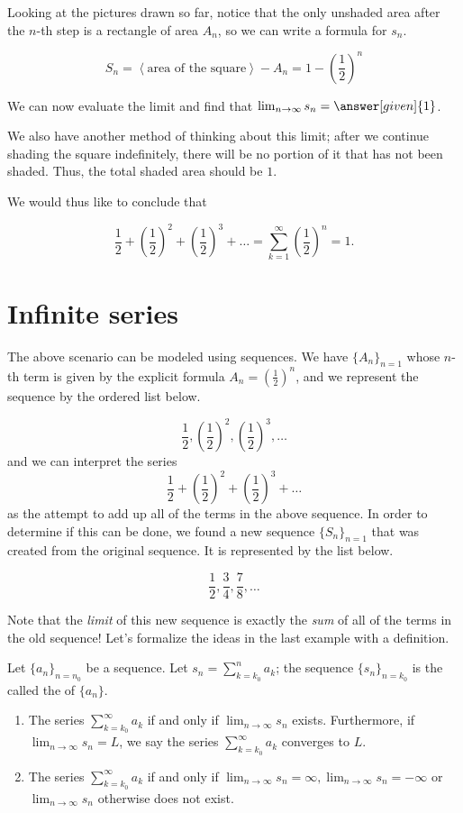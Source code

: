 \documentclass{ximera}
\begin{document}
\begin{example}
Looking at the pictures drawn so far, notice that the only unshaded area after the $n$-th step is a rectangle of area $A_n$, so we can write a formula for $s_n$.   

\[
S_n = \left<\textrm{area of the square}\right>-A_n = 1-\left(\frac{1}{2}\right)^n
\]

We can now evaluate the limit and find that $\lim_{n \to \infty} s_n =\answer[given]{1}$.

We also have another method of thinking about this limit; after we continue shading the square indefinitely, there will be no portion of it that has not been shaded.  Thus, the total shaded area should be $1$.

We would thus like to conclude that

\[
\frac{1}{2} + \left(\frac{1}{2}\right)^2+ \left(\frac{1}{2}\right)^3+ \ldots = \sum_{k=1}^{\infty} \left(\frac{1}{2}\right)^n =1.
\]
\end{example}

\section{Infinite series}
The above scenario can be modeled using sequences.  We have $\{A_n\}_{n=1}$ whose $n$-th term is given by the explicit formula $A_n=\left(\frac{1}{2}\right)^n$, and we represent the sequence by the ordered list below.

\[
\frac{1}{2},\left(\frac{1}{2}\right)^2,\left(\frac{1}{2}\right)^3,\ldots
\]
and we can interpret the series $$\frac{1}{2} + \left(\frac{1}{2}\right)^2+ \left(\frac{1}{2}\right)^3+ \ldots$$ as the attempt to add up all of the terms in the above sequence.  In order to determine if this can be done, we found a new sequence $\{S_n\}_{n=1}$ that was created from the original sequence.  It is represented by the list below.

\[
\frac{1}{2},\frac{3}{4},\frac{7}{8},\ldots
\]

Note that the \emph{limit} of this new sequence is exactly the \emph{sum} of all of the terms in the old sequence!  Let's formalize the ideas in the last example with a definition.

\begin{definition}
Let $\{a_n\}_{n=n_0}$ be a sequence.  Let $s_n = \sum_{k=k_0}^n a_k$; the sequence $\{s_n\}_{n=k_0}$ is the called the
   of $\{a_n\}$.  

\begin{enumerate}
\item The series $\sum_{k=k_0}^\infty a_k$  if and only if $\lim_{n\to\infty} s_n$ exists.  Furthermore, if $\lim_{n\to\infty} s_n =L$, we say the series $\sum_{k=k_0}^\infty a_k$ converges to $L$. 
\item The series $\sum_{k=k_0}^\infty a_k$  if and only if $\lim_{n\to\infty} s_n = \infty, \lim_{n\to\infty} s_n = -\infty$ or $\lim_{n\to\infty} s_n $ otherwise does not exist.  
\end{enumerate}
\end{definition}
\end{document}
